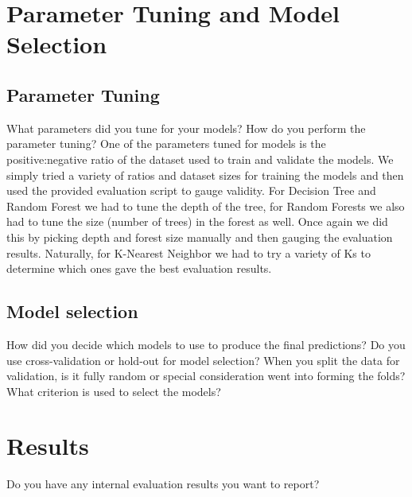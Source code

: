 \documentclass[11pt,a4paper]{article}
\begin{document}
\section{Parameter Tuning and Model Selection }

\subsection{Parameter Tuning}
What parameters did you tune for your models? How do you perform the parameter tuning?
One of the parameters tuned for models is the positive:negative ratio of the dataset used to train and validate the models. We simply tried a variety of ratios and dataset sizes for training the models and then used the provided evaluation script to gauge validity. For Decision Tree and Random Forest we had to tune the depth of the tree, for Random Forests we also had to tune the size (number of trees) in the forest as well. Once again we did this by picking depth and forest size manually and then gauging the evaluation results. Naturally, for K-Nearest Neighbor we had to try a variety of Ks to determine which ones gave the best evaluation results. 


\subsection{Model selection}
How did you decide which models to use to produce the final predictions?  Do you use cross-validation or hold-out for model selection? When you split the data for validation, is it fully random or special consideration went into forming the folds? What criterion is used to select the models?


\section{Results}
Do you have any internal evaluation results you want to report?
\end{document}
